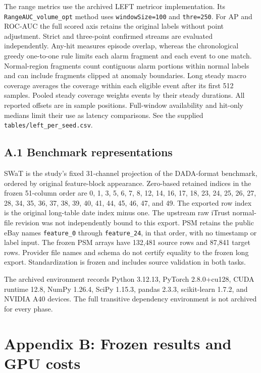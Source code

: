 \documentclass[11pt]{article}
\begin{document}
The range metrics use the archived LEFT metricor implementation.
Its \texttt{RangeAUC\_volume\_opt} method uses \texttt{windowSize=100}
and \texttt{thre=250}. For AP and ROC-AUC the
full scored axis retains the original labels without point adjustment.
Strict and three-point confirmed streams are evaluated independently.
Any-hit measures episode overlap, whereas the chronological greedy
one-to-one rule limits each alarm fragment and each event to one match.
Normal-region fragments count contiguous alarm portions within normal
labels and can include fragments clipped at anomaly boundaries. Long
steady macro coverage averages the coverage within each eligible event
after its first 512 samples. Pooled steady coverage weights events by
their steady durations. All reported offsets are in sample positions.
Full-window availability and hit-only medians limit their use as latency
comparisons. See the supplied \texttt{tables/left\_per\_seed.csv}.

\subsection{A.1 Benchmark
representations}\label{a.1-benchmark-representations}

SWaT is the study's fixed 31-channel projection of the DADA-format
benchmark, ordered by original feature-block appearance. Zero-based
retained indices in the frozen 51-column order are
0, 1, 3, 5, 6, 7, 8, 12, 14, 16, 17, 18, 23, 24, 25, 26, 27, 28,
34, 35, 36, 37, 38, 39, 40, 41, 44, 45, 46, 47, and 49.
The exported row index is the original long-table date index minus one.
The upstream raw iTrust normal-file revision was not independently bound
to this export. PSM retains the public eBay names \texttt{feature\_0}
through \texttt{feature\_24}, in that order, with no timestamp or label
input. The frozen PSM arrays have 132,481 source rows and 87,841 target
rows. Provider file names and schema do not certify equality to the
frozen long export. Standardization is frozen and includes source
validation in both tasks.

The archived environment records Python 3.12.13, PyTorch 2.8.0+cu128,
CUDA runtime 12.8, NumPy 1.26.4, SciPy 1.15.3, pandas 2.3.3,
scikit-learn 1.7.2, and NVIDIA A40 devices. The full transitive
dependency environment is not archived for every phase.

\section{Appendix B: Frozen results and GPU
costs}\label{appendix-b-frozen-results-and-gpu-costs}
\end{document}
